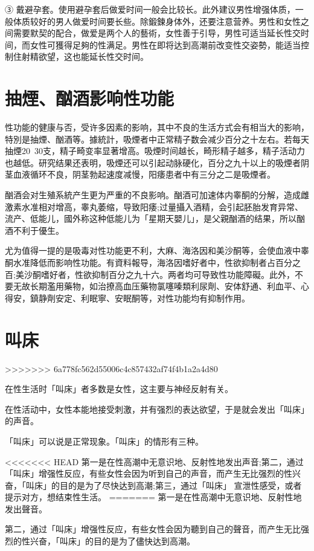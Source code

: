 \documentclass[12pt,UTF8]{ctexbook}
\begin{document}
③ 戴避孕套。使用避孕套后做爱时间一般会比较长。此外建议男性增强体质，一般体质较好的男人做爱时间要长些。除鍛鍊身体外，还要注意营养。男性和女性之间需要默契的配合，做爱是两个人的藝術，女性善于引导，男性可适当延长性交时间，而女性可獲得足夠的性满足。男性在即将达到高潮前改变性交姿勢，能适当控制住射精欲望，这也能延长性交时间。

\section{抽煙、酗酒影响性功能}

性功能的健康与否，受许多因素的影响，其中不良的生活方式会有相当大的影响，特別是抽煙、酗酒等。據統計，吸煙者中正常精子数会减少百分之十左右。若每天抽煙20~30支，精子畸变率显著增高。吸煙时间越长，畸形精子越多，精子活动力也越低。研究结果还表明，吸煙还可以引起动脉硬化，百分之九十以上的吸煙者阴茎血液循环不良，阴茎勃起速度减慢，阳痿患者中有三分之二是吸煙者。

酗酒会对生殖系統产生更为严重的不良影响。酗酒可加速体内睾酮的分解，造成雌激素水准相对增高，睾丸萎缩，导致阳痿;过量攝入酒精，会引起胚胎发育异常、流产、低能儿，國外称这种低能儿为「星期天嬰儿」，是父親酗酒的结果，所以酗酒不利于優生。

尤为值得一提的是吸毒对性功能更不利，大麻、海洛因和美沙酮等，会使血液中睾酮水准降低而影响性功能。有資料報导，海洛因嗜好者中，性欲抑制者占百分之百;美沙酮嗜好者，性欲抑制百分之九十六。两者均可导致性功能障礙。此外，不要无故长期濫用藥物，如治撩高血压藥物氯噻嗪類利尿劑、安体舒通、利血平、心得安，鎮静劑安定、利眠寧、安眠酮等，对性功能均有抑制作用。

\section{叫床}
>>>>>>> 6a778fc562d55006c4c857432af74f4b1a2a4d80

在性生活时「叫床」者多数是女性，这主要与神经反射有关。

在性活动中，女性本能地接受刺激，并有强烈的表达欲望，于是就会发出「叫床」的声音。

「叫床」可以说是正常现象。「叫床」的情形有三种。

<<<<<<< HEAD
第一是在性高潮中无意识地、反射性地发出声音;第二，通过「叫床」增强性反应，有些女性会因为听到自己的声音，而产生无比强烈的性兴奋，「叫床」的目的是为了尽快达到高潮;第三，通过「叫床」
宣泄性感受，或者提示对方，想结束性生活。
=======
第一是在性高潮中无意识地、反射性地发出聲音。

第二，通过「叫床」增强性反应，有些女性会因为聽到自己的聲音，而产生无比强烈的性兴奋，「叫床」的目的是为了儘快达到高潮。
\end{document}
